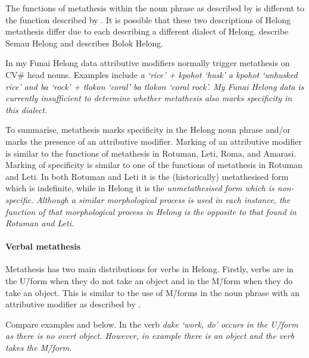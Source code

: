 The functions of metathesis within the noun phrase as described by
\cite{st96b} is different to the function described by \cite{baca12}.
It is possible that these two descriptions
of Helong metathesis differ due to each describing
a different dialect of Helong.
\cite{baca12} describe Semau Helong
and \cite{st96b} describes Bolok Helong.

In my Funai Helong data
attributive modifiers normally trigger metathesis on CV{\#} head nouns.
Examples include \it{a} `rice' + \it{kpohot} `husk'
{\ra} \it{a kpohot} `unhusked rice' and
\it{ba} `rock' + \it{tlokon} `coral' {\ra}
\it{ba tlokon} `coral rock'.
My Funai Helong data is currently insufficient to
determine whether metathesis also marks specificity in this dialect.

To summarise, metathesis marks specificity in the Helong noun phrase
and/or marks the presence of an attributive modifier.
Marking of an attributive modifier is similar to the functions
of metathesis in Rotuman, Leti, Roma, and Amarasi.
Marking of specificity is similar to one of the functions of metathesis in Rotuman and Leti.
In both Rotuman and Leti it is the (historically) metathesised form which is indefinite,
while in Helong it is the \it{un}metathesised form which is non-specific.
Although a similar morphological process is used in each instance,
the function of that morphological process in Helong is the opposite
to that found in Rotuman and Leti.

\paragraph{Verbal metathesis}\label{sec:VerMet}
Metathesis has two main distributions for verbs in Helong.
Firstly, verbs are in the U\=/form when they do not take an object
and in the M\=/form when they do take an object.
This is similar to the use of M\=/forms in the noun
phrase with an attributive modifier as described by \cite{st96b}.

Compare examples  and  below.
In  the verb \it{dake} `work, do' occurs in the U\=/form
as there is no overt object.
However, in example  there is an object
and the verb takes the M\=/form.

\begin{exe}\let\eachwordone=\itshape
	\label{ex:HelObj1}
	\label{ex:HelObj2}
\end{exe}

